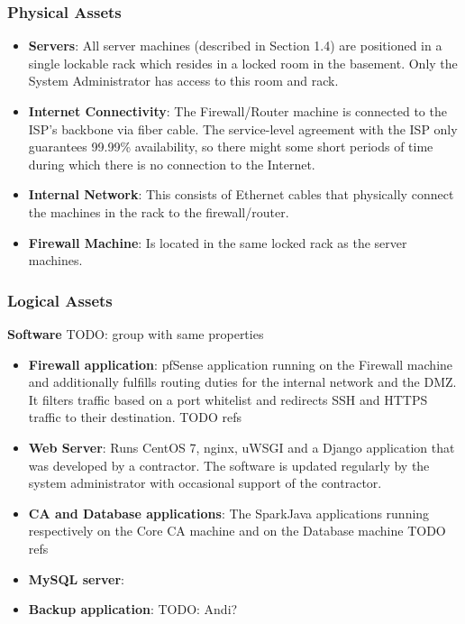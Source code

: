 \documentclass[english]{article}
\begin{document}

\subsubsection{\textbf{Physical Assets}}
\begin{itemize}
\item \textbf{Servers}: All server machines (described in Section 1.4) are positioned in a single lockable rack which resides in a locked room in the basement. Only the System Administrator has access to this room and rack.
\item \textbf{Internet Connectivity}: The Firewall/Router machine is connected to the ISP's backbone via fiber cable. The service-level agreement with the ISP only guarantees 99.99\% availability, so there might some short
periods of time during which there is no connection to the Internet.
\item \textbf{Internal Network}: This consists of Ethernet cables that physically connect the machines in the rack to the firewall/router.
\item \textbf{Firewall Machine}: Is located in the same locked rack as the server machines. 
\end{itemize}


\subsubsection{\textbf{Logical Assets}}

\textbf{Software}
TODO: group with same properties
\begin{itemize}
\item \textbf{Firewall application}: pfSense application running on the Firewall machine and additionally fulfills routing duties for the internal network and the DMZ. It filters traffic based on a port whitelist and redirects
SSH and HTTPS traffic to their destination. TODO refs
\item \textbf{Web Server}: Runs CentOS 7, nginx, uWSGI and a Django application that was developed by a contractor. The software is updated regularly by the system administrator with occasional support of the contractor. 
\item \textbf{CA and Database applications}: The SparkJava applications running respectively on the Core CA machine and on the Database machine TODO refs
\item \textbf{MySQL server}:
\item \textbf{Backup application}: TODO: Andi?
\end{itemize}
\end{document}
